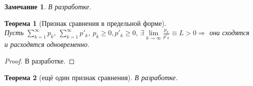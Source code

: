 \documentclass[12pt, oneside]{article}
\theoremstyle{plain}
\newtheorem{Theorem}{Теорема}
\newtheorem{Note}{Замечание}
\newcommand{\llim}{\lim\limits}
\newcommand{\lsum}{\sum\limits}
\begin{document}
	\begin{Note}
		В разработке.
	\end{Note}

	\begin{Theorem}[Признак сравнения в предельной форме] \ \\
		Пусть \(\lsum_{k=1}^{\infty} p_k\), \(\lsum_{k=1}^{\infty} p'_k\), \(p_k 
		\geq 0, p'_k \geq 0,\ \exists \llim_{k\to\infty} \frac{p_k}{p'_k} 
		\equiv L > 0 \Rightarrow \) они сходятся и расходятся одновременно.
	\end{Theorem}
	\begin{proof}
		В разработке.
	\end{proof}

	\begin{Theorem}[ещё один признак сравнения]
		В разработке.
	\end{Theorem}
\end{document}
